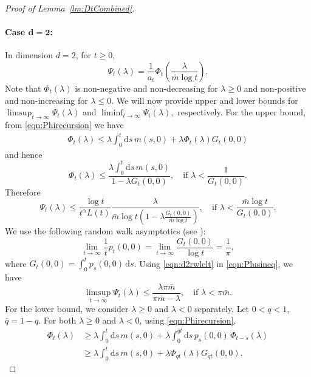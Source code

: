 \documentclass{article}[12pt]
\theoremstyle{definition}
\newcommand{\1}{\mathbbm{1}}
\newcommand{\dd }{\mathrm{d} }
\begin{document}
\begin{proof}[Proof of Lemma~\ref{lm:DtCombined}]
\paragraph{Case $\mathbf{d=2}$:} 
In dimension $d=2$, for $t\geq 0$,
$$\Psi_t(\lambda) = \frac{1}{a_t}\Phi_t\left(\frac{\lambda}{\bar{m}\log t}\right).$$
Note that $\Phi_t(\lambda)$ is non-negative and non-decreasing for $\lambda\ge 0$ and non-positive and non-increasing for $\lambda\le 0$.  We will now provide upper and lower bounds for $\limsup_{t\to \infty}\Psi_t(\lambda)$ and $\liminf_{t\to \infty}\Psi_t(\lambda),$ respectively. For the upper bound, from \eqref{eqn:Phirecursion} we have
\begin{align}
    \Phi_t(\lambda) \le \lambda\int_0^t \dd s\, m(s,0) + \lambda\Phi_t(\lambda)G_t(0,0)
    \label{eqn:d2upperbound}
\end{align}
and hence
$$\Phi_t(\lambda) \le \frac{\lambda\int_0^t \dd s\, m(s,0)}{1- \lambda G_t(0,0)}, \quad \text{if } \lambda < \frac{1}{G_t(0,0)}.$$
Therefore
\begin{equation}
\Psi_t(\lambda) \le \frac{\log t}{t^\alpha L(t)}\frac{\lambda }{\bar{m}\log t(1 - \lambda\frac{G_t(0,0)}{\bar{m}\log t})}, \quad \text{if }\lambda< \frac{\bar{m}\log t}{G_t(0,0)}.
\label{eqn:Plusineq}
\end{equation}
We use the following random walk asymptotics (see \cite[Chapter~II.7, Proposition~9]{S1964}):
\begin{equation}
\lim_{t\to \infty}\frac{1}{t}p_t(0,0) = \lim_{t\to \infty}\frac{G_t(0,0)}{\log t} = \frac{1}{\pi},
\label{eqn:d2rwlclt}
\end{equation}
where $G_t(0,0) = \int_0^t p_s(0,0)\,\dd s$.
Using \eqref{eqn:d2rwlclt} in \eqref{eqn:Plusineq}, we have
\begin{equation}
    \limsup_{t\to \infty}\Psi_t(\lambda) \le \frac{\lambda \pi \bar{m}}{\pi\bar{m} - \lambda}, \quad \text{if }\lambda< \pi\bar{m}.
    \label{eqn:d2limsup}
\end{equation}
For the lower bound, we consider $\lambda\ge 0$ and $\lambda < 0$ separately. Let $0<q<1$, $\bar{q} = 1-q$. For both $\lambda\ge 0$ and $\lambda<0$, using \eqref{eqn:Phirecursion},
\begin{align}
     {\Phi}_t(\lambda) &\ge \lambda \int_0^t\dd s\,m(s,0) +\lambda \int_{0}^{\bar{q}t} \dd s\, p_{s}(0,0)\,{\Phi}_{t-s}(\lambda)\nonumber\\
     &\ge \lambda \int_0^t\dd s\,m(s,0) +\lambda \Phi_{qt}(\lambda)G_{\bar{q}t}(0,0).\label{eqn:d2lowerbound}
\end{align}

\end{proof}
\end{document}
